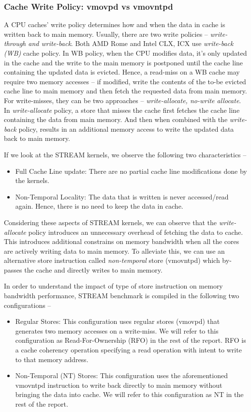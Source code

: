 \documentclass{article}
\begin{document}
\subsubsection{Cache Write Policy: vmovpd vs vmovntpd}
A CPU caches' write policy determines how and when the data in cache is written back to main memory. Usually, there are two write policies -- \textit{write-through and write-back}. Both AMD Rome and Intel CLX, ICX use \textit{write-back (WB)} cache policy. In WB policy, when the CPU modifies data, it's only updated in the cache and the write to the main memory is postponed until the cache line containing the updated data is evicted. Hence, a read-miss on a WB cache may require two memory accesses -- if modified, write the contents of the to-be evicted cache line to main memory and then fetch the requested data from main memory. For write-misses, they can be two approaches -- \textit{write-allocate, no-write allocate}. In \textit{write-allocate} policy, a store that misses the cache first fetches the cache line containing the data from main memory. And then when combined with the \textit{write-back} policy, results in an additional memory access to write the updated data back to main memory.

If we look at the STREAM kernels, we observe the following two characteristics --
\begin{itemize}
\item Full Cache Line update: There are no partial cache line modifications done by the kernels.
\item Non-Temporal Locality: The data that is written is never accessed/read again. Hence, there is no need to keep the data in cache.
\end{itemize}

Considering these aspects of STREAM kernels, we can observe that the \textit{write-allocate} policy introduces an unnecessary overhead of fetching the data to cache. This introduces additional constrains on memory bandwidth when all the cores are actively writing data to main memory. To alleviate this, we can use an alternative store instruction called \textit{non-temporal} store (vmovntpd) which by-passes the cache and directly writes to main memory.

In order to understand the impact of type of store instruction on memory bandwidth performance, STREAM benchmark is compiled in the following two configurations --
\begin{itemize}
\item Regular Stores: This configuration uses regular stores (vmovpd) that generates two memory accesses on a write-miss. We will refer to this configuration as Read-For-Ownership (RFO) in the rest of the report. RFO is a cache coherency operation specifying a read operation with intent to write to that memory address.
\item Non-Temporal (NT) Stores: This configuration uses the aforementioned vmovntpd instruction to write back directly to main memory without bringing the data into cache. We will refer to this configuration as NT in the rest of the report.
\end{itemize}
\end{document}
